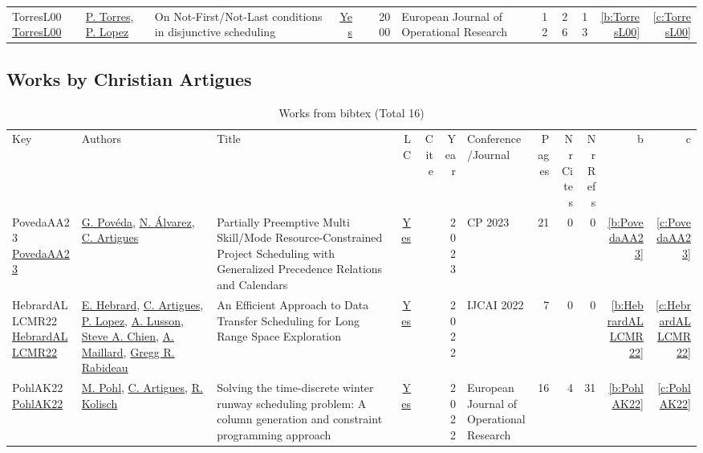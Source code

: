 {\begin{longtable}{>{\raggedright\arraybackslash}p{3cm}>{\raggedright\arraybackslash}p{6cm}>{\raggedright\arraybackslash}p{6.5cm}rrrp{2.5cm}rrrrr}
TorresL00 \href{http://dx.doi.org/10.1016/s0377-2217(99)00497-x}{TorresL00} & \hyperref[auth:a886]{P. Torres}, \hyperref[auth:a3]{P. Lopez} & On Not-First/Not-Last conditions in disjunctive scheduling & \href{works/TorresL00.pdf}{Yes} & \cite{TorresL00} & 2000 & European Journal of Operational Research & 12 & 26 & 13 & \ref{b:TorresL00} & \ref{c:TorresL00}\\
\end{longtable}
}

\subsection{Works by Christian Artigues}
\label{sec:a6}
{\scriptsize
\begin{longtable}{>{\raggedright\arraybackslash}p{3cm}>{\raggedright\arraybackslash}p{6cm}>{\raggedright\arraybackslash}p{6.5cm}rrrp{2.5cm}rrrrr}
\rowcolor{white}\caption{Works from bibtex (Total 16)}\\ \toprule
\rowcolor{white}Key & Authors & Title & LC & Cite & Year & \shortstack{Conference\\/Journal} & Pages & \shortstack{Nr\\Cites} & \shortstack{Nr\\Refs} & b & c \\ \midrule\endhead
\bottomrule
\endfoot
PovedaAA23 \href{https://doi.org/10.4230/LIPIcs.CP.2023.31}{PovedaAA23} & \hyperref[auth:a4]{G. Pov{\'{e}}da}, \hyperref[auth:a5]{N. {\'{A}}lvarez}, \hyperref[auth:a6]{C. Artigues} & Partially Preemptive Multi Skill/Mode Resource-Constrained Project Scheduling with Generalized Precedence Relations and Calendars & \href{works/PovedaAA23.pdf}{Yes} & \cite{PovedaAA23} & 2023 & CP 2023 & 21 & 0 & 0 & \ref{b:PovedaAA23} & \ref{c:PovedaAA23}\\
HebrardALLCMR22 \href{https://doi.org/10.24963/ijcai.2022/643}{HebrardALLCMR22} & \hyperref[auth:a1]{E. Hebrard}, \hyperref[auth:a6]{C. Artigues}, \hyperref[auth:a3]{P. Lopez}, \hyperref[auth:a797]{A. Lusson}, \hyperref[auth:a798]{Steve A. Chien}, \hyperref[auth:a799]{A. Maillard}, \hyperref[auth:a800]{Gregg R. Rabideau} & An Efficient Approach to Data Transfer Scheduling for Long Range Space Exploration & \href{works/HebrardALLCMR22.pdf}{Yes} & \cite{HebrardALLCMR22} & 2022 & IJCAI 2022 & 7 & 0 & 0 & \ref{b:HebrardALLCMR22} & \ref{c:HebrardALLCMR22}\\
PohlAK22 \href{https://doi.org/10.1016/j.ejor.2021.08.028}{PohlAK22} & \hyperref[auth:a446]{M. Pohl}, \hyperref[auth:a6]{C. Artigues}, \hyperref[auth:a447]{R. Kolisch} & Solving the time-discrete winter runway scheduling problem: {A} column generation and constraint programming approach & \href{works/PohlAK22.pdf}{Yes} & \cite{PohlAK22} & 2022 & European Journal of Operational Research & 16 & 4 & 31 & \ref{b:PohlAK22} & \ref{c:PohlAK22}\\

\end{longtable}}
